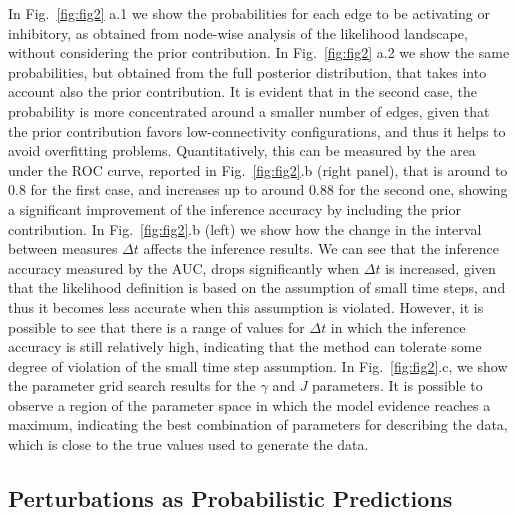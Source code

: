 \documentclass[10pt, aps, rmp,  twocolumn, superscriptaddress, floatfix, showkeys]{revtex4-2}
\begin{document}
In Fig.~\ref{fig:fig2} a.1 we show the probabilities for each edge to be activating or inhibitory, as obtained from node-wise analysis of the likelihood landscape, without considering the prior contribution. In Fig.~\ref{fig:fig2} a.2 we show the same probabilities, but obtained from the full posterior distribution, that takes into account also the prior contribution. It is evident that in the second case, the probability is more concentrated around a smaller number of edges, given that the prior contribution favors low-connectivity configurations, and thus it helps to avoid overfitting problems. Quantitatively, this can be measured by the area under the ROC curve, reported in Fig.~\ref{fig:fig2}.b (right panel), that is around to 0.8 for the first case, and increases up to around 0.88 for the second one, showing a significant improvement of the inference accuracy by including the prior contribution.
In Fig.~\ref{fig:fig2}.b (left) we show how the change in the interval between measures $\Delta t$ affects the inference results. We can see that the inference accuracy measured by the AUC, drops significantly when $\Delta t$ is increased, given that the likelihood definition is based on the assumption of small time steps, and thus it becomes less accurate when this assumption is violated. However, it is possible to see that there is a range of values for $\Delta t$ in which the inference accuracy is still relatively high, indicating that the method can tolerate some degree of violation of the small time step assumption.
In Fig.~\ref{fig:fig2}.c, we show the parameter grid search results for the $\gamma$ and $J$ parameters. It is possible to observe a region of the parameter space in which the model evidence reaches a maximum, indicating the best combination of parameters for describing the data, which is close to the true values used to generate the data.


\subsection{Perturbations as Probabilistic Predictions}
\end{document}
